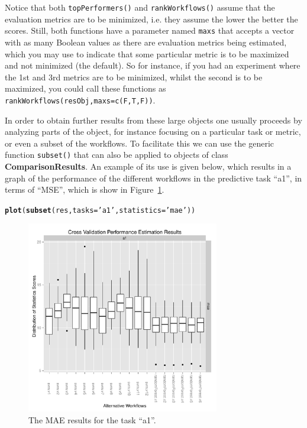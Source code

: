 \documentclass[10pt,a4paper]{article}\usepackage[]{graphicx}\usepackage[]{color}
\makeatletter
\newcommand{\hlstr}[1]{\textcolor[rgb]{0.192,0.494,0.8}{#1}}%
\newcommand{\hlstd}[1]{\textcolor[rgb]{0.345,0.345,0.345}{#1}}%
\newcommand{\hlkwc}[1]{\textcolor[rgb]{0.333,0.667,0.333}{#1}}%
\newcommand{\hlkwd}[1]{\textcolor[rgb]{0.737,0.353,0.396}{\textbf{#1}}}%
\newenvironment{kframe}{%
 \def\at@end@of@kframe{}%
 \ifinner\ifhmode%
  \def\at@end@of@kframe{\end{minipage}}%
  \begin{minipage}{\columnwidth}%
 \fi\fi%
 \def\FrameCommand##1{\hskip\@totalleftmargin \hskip-\fboxsep
 \colorbox{shadecolor}{##1}\hskip-\fboxsep
     \hskip-\linewidth \hskip-\@totalleftmargin \hskip\columnwidth}%
 \MakeFramed {\advance\hsize-\width
   \@totalleftmargin\z@ \linewidth\hsize
   \@setminipage}}%
 {\par\unskip\endMakeFramed%
 \at@end@of@kframe}
\newenvironment{knitrout}{}{} %
\makeatother
\begin{document}
Notice that both \texttt{topPerformers()} and \texttt{rankWorkflows()}
assume that the evaluation metrics are to be minimized, i.e. they
assume the lower the better the scores. Still, both functions have a
parameter named \texttt{maxs} that accepts a vector with as many
Boolean values as there are evaluation metrics being estimated, which
you may use to indicate that some particular metric is to be maximized
and not minimized (the default). So for instance, if you had an
experiment where the 1st and 3rd metrics are to be minimized, whilst
the second is to be maximized, you could call these functions as
\texttt{rankWorkflows(resObj,maxs=c(F,T,F))}.

In order to obtain further results from these large objects one
usually proceeds by analyzing parts of the object, for instance
focusing on a particular task or metric, or even a subset of the
workflows. To facilitate this we can use the generic function
\texttt{subset()} that can also be applied to objects of class
\textbf{ComparisonResults}. An example of its use is given below, which results
in a graph of the performance of the different workflows in the
predictive task ``a1'', in terms of ``MSE'', which is show in
Figure~\ref{fig:maeA1}.


\begin{knitrout}
\color{fgcolor}\begin{kframe}
\begin{alltt}
\hlkwd{plot}\hlstd{(}\hlkwd{subset}\hlstd{(res,}\hlkwc{tasks}\hlstd{=}\hlstr{'a1'}\hlstd{,}\hlkwc{statistics}\hlstd{=}\hlstr{'mae'}\hlstd{))}
\end{alltt}
\end{kframe}\begin{figure}[]


{\centering \includegraphics[width=0.75\textwidth]{figures/perfEst-maeA1} 

}

\caption[The MAE results for the task ``a1'']{The MAE results for the task ``a1''.\label{fig:maeA1}}
\end{figure}


\end{knitrout}
\end{document}

